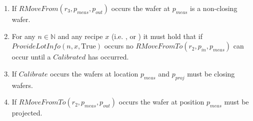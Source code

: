 \begin{enumerate}
    \item If $RMoveFrom(r_3,p_\mathit{meas}, p_\mathit{out})$ occurs the wafer at $p_\mathit{meas}$ is a non-closing wafer.

    \item For any $n \in \mathbb{N}$ and any recipe $x$ (i.e. \recipeOne, \recipeTwo or \recipeThree) it must hold that if $\mathit{ProvideLotInfo}(n, x, \text{True})$ occurs no $\mathit{RMoveFromTo}(r_2, p_\mathit{in}, p_\mathit{meas})$ can occur until a $\mathit{Calibrated}$ has occurred.
    \item If $Calibrate$ occurs the wafers at location $p_\mathit{meas}$ and $p_\mathit{proj}$ must be closing wafers.
    \item If $\mathit{RMoveFromTo}\left(r_2, p_\mathit{meas}, p_\mathit{out}\right)$ occurs the wafer at position $p_\mathit{meas}$ must be projected.
\end{enumerate}
